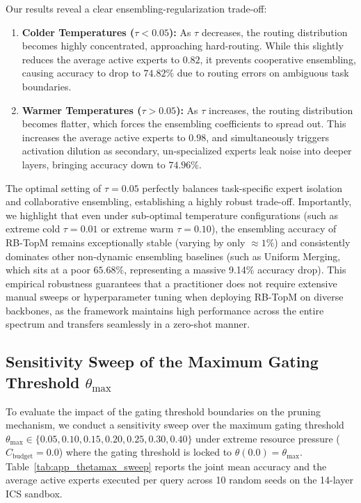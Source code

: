 \documentclass{article}
\theoremstyle{plain}
\theoremstyle{definition}
\theoremstyle{remark}
\begin{document}
Our results reveal a clear ensembling-regularization trade-off:
\begin{enumerate}
    \item \textbf{Colder Temperatures ($\tau < 0.05$):} As $\tau$ decreases, the routing distribution becomes highly concentrated, approaching hard-routing. While this slightly reduces the average active experts to $0.82$, it prevents cooperative ensembling, causing accuracy to drop to $74.82\%$ due to routing errors on ambiguous task boundaries.
    \item \textbf{Warmer Temperatures ($\tau > 0.05$):} As $\tau$ increases, the routing distribution becomes flatter, which forces the ensembling coefficients to spread out. This increases the average active experts to $0.98$, and simultaneously triggers activation dilution as secondary, un-specialized experts leak noise into deeper layers, bringing accuracy down to $74.96\%$.
\end{enumerate}
The optimal setting of $\tau = 0.05$ perfectly balances task-specific expert isolation and collaborative ensembling, establishing a highly robust trade-off. Importantly, we highlight that even under sub-optimal temperature configurations (such as extreme cold $\tau = 0.01$ or extreme warm $\tau = 0.10$), the ensembling accuracy of RB-TopM remains exceptionally stable (varying by only $\approx 1\%$) and consistently dominates other non-dynamic ensembling baselines (such as Uniform Merging, which sits at a poor $65.68\%$, representing a massive 9.14\% accuracy drop). This empirical robustness guarantees that a practitioner does not require extensive manual sweeps or hyperparameter tuning when deploying RB-TopM on diverse backbones, as the framework maintains high performance across the entire spectrum and transfers seamlessly in a zero-shot manner.

\subsection{Sensitivity Sweep of the Maximum Gating Threshold $\theta_{\max}$}
To evaluate the impact of the gating threshold boundaries on the pruning mechanism, we conduct a sensitivity sweep over the maximum gating threshold $\theta_{\max} \in \{0.05, 0.10, 0.15, 0.20, 0.25, 0.30, 0.40\}$ under extreme resource pressure ($C_{\text{budget}} = 0.0$) where the gating threshold is locked to $\theta(0.0) = \theta_{\max}$. Table~\ref{tab:app_thetamax_sweep} reports the joint mean accuracy and the average active experts executed per query across 10 random seeds on the 14-layer ICS sandbox.
\end{document}

